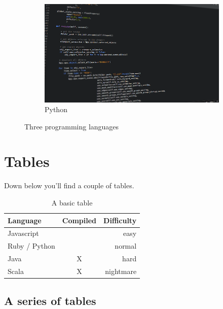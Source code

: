 \begin{figure}[H]
\begin{subfigure}[b]{0.3\textwidth}
		\centering
		\includegraphics[width=\textwidth]{images/programmingLanguages/python.png}
		\caption{Python}
		\label{fig:python}
	\end{subfigure}
	\caption{Three programming languages}
	\label{fig:three graphs}
\end{figure}


\section{Tables}
Down below you'll find a couple of tables.
\begin{table}[H]
	\label{tab:basicTable}
	\centering
	\caption[A basic table]{A basic table}
	\begin{tabular}{l c r} %
		Language & Compiled & Difficulty \\ \hline	
		Javascript & \ & easy \\
		Ruby / Python & \ & normal \\
		Java & X & hard \\
		Scala & X & nightmare \\
	\end{tabular}
\end{table}


\subsection{A series of tables}


